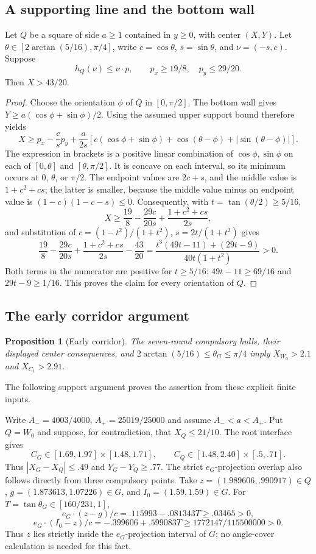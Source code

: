 \documentclass[11pt]{article}
\newtheorem{proposition}[theorem]{Proposition}
\begin{document}
\subsection{A supporting line and the bottom wall}
Let $Q$ be a square of side $a\ge1$ contained in $y\ge0$, with center
$(X,Y)$. Let $\theta\in[2\arctan(5/16),\pi/4]$, write
$c=\cos\theta$, $s=\sin\theta$, and $\nu=(-s,c)$.
Suppose
\[
 h_Q(\nu)\le\nu\cdot p,
 \qquad p_x\ge19/8,\quad p_y\le29/20.
\]
Then $X>43/20$.

\begin{proof}
Choose the orientation $\phi$ of $Q$ in $[0,\pi/2]$.
The bottom wall gives $Y\ge a(\cos\phi+\sin\phi)/2$.
Using the assumed upper support bound therefore yields
\[
 X\ge p_x-\frac cs p_y+
 \frac{a}{2s}\left[
 c(\cos\phi+\sin\phi)+\cos(\theta-\phi)
                         +|\sin(\theta-\phi)|\right].
\]
The expression in brackets is a positive linear combination of
$\cos\phi,\sin\phi$ on each of $[0,\theta]$ and
$[\theta,\pi/2]$. It is concave on each interval, so its minimum
occurs at $0$, $\theta$, or $\pi/2$. The endpoint values are
$2c+s$, and the middle value is $1+c^2+cs$; the latter is smaller,
because the middle value minus an endpoint value is $(1-c)(1-c-s)\le0$.
Consequently, with $t=\tan(\theta/2)\ge5/16$,
\[
 X\ge\frac{19}{8}-\frac{29c}{20s}
              +\frac{1+c^2+cs}{2s},
\]
and substitution of $c=(1-t^2)/(1+t^2)$, $s=2t/(1+t^2)$ gives
\[
 \frac{19}{8}-\frac{29c}{20s}+\frac{1+c^2+cs}{2s}
 -\frac{43}{20}
 =\frac{t^3(49t-11)+(29t-9)}{40t(1+t^2)}>0.
\]
Both terms in the numerator are positive for $t\ge5/16$:
$49t-11\ge69/16$ and $29t-9\ge1/16$.
This proves the claim for every orientation of $Q$.
\end{proof}


\subsection{The early corridor argument}

\begin{proposition}[Early corridor]\label{lem:early-corridor}
The seven-round compulsory hulls, their displayed center consequences,
and $2\arctan(5/16)\le\theta_G\le\pi/4$ imply
$X_{W_0}>2.1$ and $X_{C_1}>2.91$.
\end{proposition}
The following support argument proves the assertion from these explicit
finite inputs.

Write $A_-=4003/4000$, $A_+=25019/25000$ and assume
$A_-<a<A_+$. Put $Q=W_0$ and suppose, for contradiction, that
$X_Q\le21/10$. The root interface gives
\[
 C_G\in[1.69,1.97]\times[1.48,1.71],\qquad
 C_Q\in[1.48,2.40]\times[.5,.71].
\]
Thus $|X_G-X_Q|\le.49$ and $Y_G-Y_Q\ge.77$.
The strict $e_G$-projection overlap also follows directly from three
compulsory points. Take $z=(1.989606,.990917)\in Q$,
$g=(1.873613,1.07226)\in G$, and $I_0=(1.59,1.59)\in G$.
For $T=\tan\theta_G\in[160/231,1]$,
\[
 e_G\cdot(z-g)/c=.115993-.081343T\ge.03465>0,
\]
\[
 e_G\cdot(I_0-z)/c=-.399606+.599083T
       \ge1772147/115500000>0.
\]
Thus $z$ lies strictly inside the $e_G$-projection interval of $G$;
no angle-cover calculation is needed for this fact.
\end{document}
